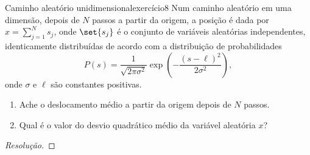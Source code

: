 \begin{exercício}{Caminho aleatório unidimensional}{exercício8}
    Num caminho aleatório em uma dimensão, depois de \(N\) passos a partir da origem, a posição é dada por \(x = \sum_{j=1}^N s_j\), onde \(\set{s_j}\) é o conjunto de variáveis aleatórias independentes, identicamente distribuídas de acordo com a distribuição de probabilidades
    \begin{equation*}
        P(s) = \frac{1}{\sqrt{2\pi \sigma^2}} \exp{\left(-\frac{(s - \ell)^2}{2 \sigma^2}\right)},
    \end{equation*}
    onde \(\sigma\) e \(\ell\) são constantes positivas.
    \begin{enumerate}[label=(\alph*)]
        \item Ache o deslocamento médio a partir da origem depois de \(N\) passos.
        \item Qual é o valor do desvio quadrático médio da variável aleatória \(x\)?
    \end{enumerate}
\end{exercício}
\begin{proof}[Resolução]

\end{proof}
